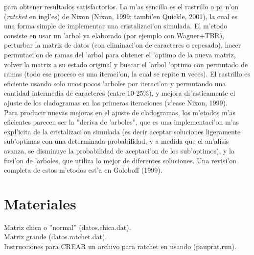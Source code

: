 para obtener resultados satisfactorios. La m'as sencilla es el rastrillo o
pi~n'on (\textit{ratchet} en ingl'es) de Nixon (Nixon,
1999; tambi'en Quickle, 2001), la cual es una forma simple de implementar una
cristalizaci'on simulada. El m'etodo consiste en usar un 'arbol ya elaborado
(por ejemplo con Wagner+TBR), perturbar la matriz de datos (con eliminaci'on de
caracteres o repesado), hacer permutaci'on de ramas del 'arbol para obtener el
'optimo de la nueva matriz, volver la matriz a su estado original y buscar el
'arbol 'optimo con permutado de ramas (todo ese proceso es una iteraci'on, la
cual se repite \textbf{n} veces). El rastrillo es eficiente usando solo unos
pocos 'arboles por iteraci'on y permutando una cantidad intermedia de caracteres
(entre 10-25\%), y mejora dr'asticamente el ajuste de los cladogramas en las
primeras iteraciones (v'ease Nixon, 1999).\\
Para producir nuevas mejoras en el ajuste de cladogramas, los m'etodos m'as
eficientes parecen ser la ''deriva de 'arboles'', que es una implementaci'on
m'as expl'icita de la cristalizaci'on simulada (es decir aceptar soluciones
ligeramente sub'optimas con una determinada probabilidad, y a medida que el
an'alisis avanza, se disminuye la probabilidad de aceptaci'on de los
sub'optimos), y la fusi'on de 'arboles, que utiliza lo mejor de diferentes
soluciones. Una revisi'on completa de estos m'etodos est'a en Goloboff (1999).
\section{Materiales}
\noindent
Matriz chica o ''normal'' (datos.chica.dat).\\
Matriz grande (datos.ratchet.dat).\\
Instrucciones para CREAR un archivo para ratchet en  usando
 (pauprat.run).

